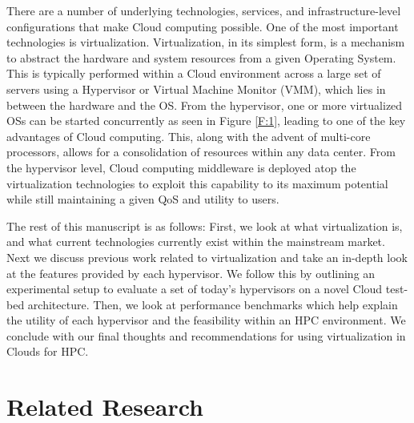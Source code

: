 There are a number of underlying technologies, services, and infrastructure-level configurations that make Cloud computing possible.  One of the most important technologies is virtualization. Virtualization, in its simplest form, is a mechanism to abstract the hardware and system resources from a given Operating System.  This is typically performed  within a Cloud environment across a large set of servers using a Hypervisor or Virtual Machine Monitor (VMM), which lies in between the hardware and the OS. From the hypervisor, one or more virtualized OSs can be started concurrently as seen in Figure \ref{F:1}, leading to one of the key advantages of Cloud computing.  This, along with the advent of multi-core processors, allows for a consolidation of resources within any data center.  From the hypervisor level, Cloud computing middleware is deployed atop the virtualization technologies to exploit this capability to its maximum potential while still maintaining a given QoS and utility to users.

\begin{comment}
 \FIGURE{htb}
  {images/VMM.pdf}
  {1.0}
  {Virtual Machine Abstraction}
  {F:blah}
\end{comment}

The rest of this manuscript is as follows:  First, we look at what virtualization is, and what current technologies currently exist within the mainstream market. Next we discuss previous work related to virtualization and take an in-depth look at the features provided by each hypervisor.  We follow this by outlining an experimental setup to evaluate a set of today's hypervisors on a novel Cloud test-bed architecture. Then, we look at performance benchmarks which help explain the utility of each hypervisor and the feasibility within an HPC environment. We conclude with our final thoughts and recommendations for using virtualization in Clouds for HPC.   


\section{Related Research}

